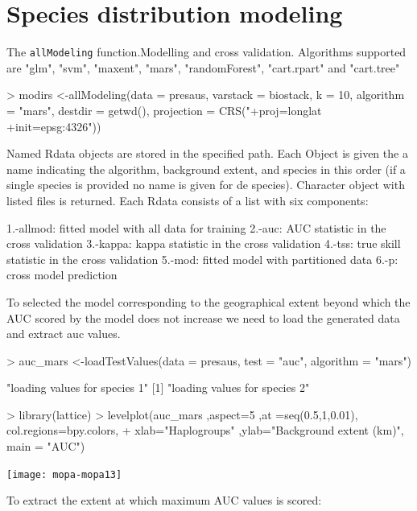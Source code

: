 \documentclass[10pt,a4paper]{report}
\begin{document}
\chapter{Species distribution modeling}


The \texttt{allModeling} function.Modelling and cross validation. Algorithms supported are "glm", "svm", "maxent", "mars", "randomForest", "cart.rpart" and "cart.tree"

\begin{Schunk}
\begin{Sinput}
> modirs <-allModeling(data = presaus, varstack = biostack, k = 10, algorithm = "mars", destdir = getwd(), projection = CRS("+proj=longlat +init=epsg:4326"))
\end{Sinput}
\end{Schunk}

Named Rdata objects are stored in the specified path. Each Object is given the a name indicating the algorithm, background extent, and species in this order (if a single species is provided no name is given for de species). Character object with listed files is returned. Each Rdata consists of a list with six components:

	1.-allmod: fitted model with all data for training 
	2.-auc: AUC statistic in the cross validation
	3.-kappa: kappa statistic in the cross validation
	4.-tss: true skill statistic in the cross validation
	5.-mod: fitted model with partitioned data 
	6.-p: cross model prediction 


To selected the model corresponding to the geographical extent beyond which the AUC scored by the model does not increase we need to load the generated data and extract auc values.

\begin{Schunk}
\begin{Sinput}
> auc_mars <-loadTestValues(data = presaus, test = "auc", algorithm = "mars")
\end{Sinput}
\begin{Soutput}
[1] "loading values for species 1"
[1] "loading values for species 2"
\end{Soutput}
\begin{Sinput}
> library(lattice)
> levelplot(auc_mars ,aspect=5 ,at =seq(0.5,1,0.01), col.regions=bpy.colors,
+ xlab="Haplogroups" ,ylab="Background extent (km)", main = "AUC")
\end{Sinput}
\end{Schunk}
\texttt{[image: mopa-mopa13]}

To extract the extent at which maximum AUC values is scored:
\end{document}
